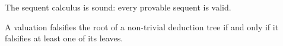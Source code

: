 \begin{page}
\setcounter{section}{2}
\setcounter{subsection}{6}
\setcounter{dfn}{15}
\label{portion:530}

\begin{thm}
\label{thm:GentzenSound}
The sequent calculus is sound: every provable sequent is valid.
\end{thm}

\end{page}

\begin{page}
\setcounter{section}{2}
\setcounter{subsection}{6}
\setcounter{dfn}{16}
\label{portion:533}

\begin{lem}
\label{lem:FalsifyRoot}
A valuation falsifies the root of a non-trivial deduction tree if and only if it falsifies at least one of its leaves.
\end{lem}

\end{page}

